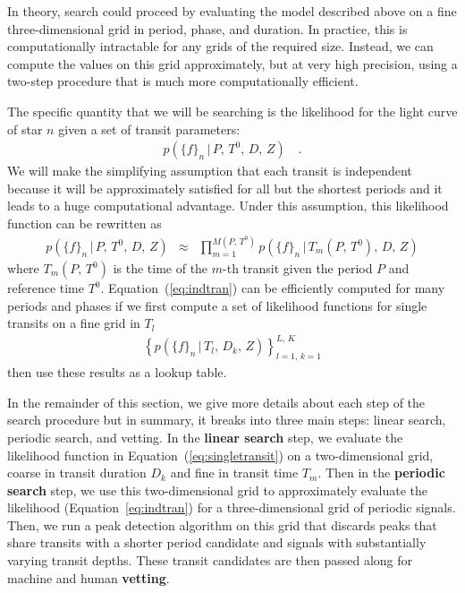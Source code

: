 \documentclass[12pt,preprint]{aastex}
\newcommand{\Eq}[1]{Equation~(\ref{eq:#1})}
\newcommand{\eq}[1]{\Eq{#1}}
\newcommand{\eqalt}[1]{Equation~\ref{eq:#1}}
\newcommand{\eqlabel}[1]{\label{eq:#1}}
\newcommand{\flux}{{\ensuremath{f}}}
\newcommand{\period}{{\ensuremath{P}}}
\newcommand{\phase}{{\ensuremath{T^0}}}
\newcommand{\duration}{{\ensuremath{D}}}
\newcommand{\depth}{{\ensuremath{Z}}}
\newcommand{\transittime}{{\ensuremath{T}}}
\begin{document}
In theory, search could proceed by evaluating the model described above on a
fine three-dimensional grid in period, phase, and duration.
In practice, this is computationally intractable for any grids of the
required size.
Instead, we can compute the values on this grid approximately, but at very
high precision, using a two-step procedure that is much more computationally
efficient.

The specific quantity that we will be searching is the likelihood for the
light curve of star $n$ given a set of transit parameters:
\begin{eqnarray}
p(\{\flux\}_n\,|\,\period,\,\phase,\,\duration,\,\depth) \quad.
\end{eqnarray}
We will make the simplifying assumption that each transit is independent
because it will be approximately satisfied for all but the shortest periods
and it leads to a huge computational advantage.
Under this assumption, this likelihood function can be rewritten as
\begin{eqnarray}\eqlabel{indtran}
p(\{\flux\}_n\,|\,\period,\,\phase,\,\duration,\,\depth) &\approx&
\prod_{m=1}^{M(\period,\,\phase)}
    p(\{\flux\}_n\,|\,\transittime_m(\period,\,\phase),\,\duration,\,
                    \depth)
\end{eqnarray}
where $\transittime_m(\period,\,\phase)$ is the time of the $m$-th
transit given the period $\period$ and reference time $\phase$.
\Eq{indtran} can be efficiently computed for many periods and phases if we
first compute a set of likelihood functions for single transits on a fine grid
in $\transittime_l$
\begin{eqnarray}\eqlabel{singletransit}
\left \{ p(\{\flux\}_n\,|\,\transittime_l,\,\duration_k,\,\depth)
\right\}_{l=1,\,k=1}^{L,\,K}
\end{eqnarray}
then use these results as a lookup table.

In the remainder of this section, we give more details about each step of the
search procedure but in summary, it breaks into three main steps: linear
search, periodic search, and vetting.
In the {\bf linear search} step, we evaluate the likelihood function in
\eq{singletransit} on a two-dimensional grid, coarse in transit duration
$\duration_k$ and fine in transit time $\transittime_m$.
Then in the {\bf periodic search} step, we use this two-dimensional grid to
approximately evaluate the likelihood (\eqalt{indtran}) for a
three-dimensional grid of periodic signals.
Then, we run a peak detection algorithm on this grid that discards peaks that
share transits with a shorter period candidate and signals with substantially
varying transit depths.
These transit candidates are then passed along for machine and human {\bf
vetting}.
\end{document}
